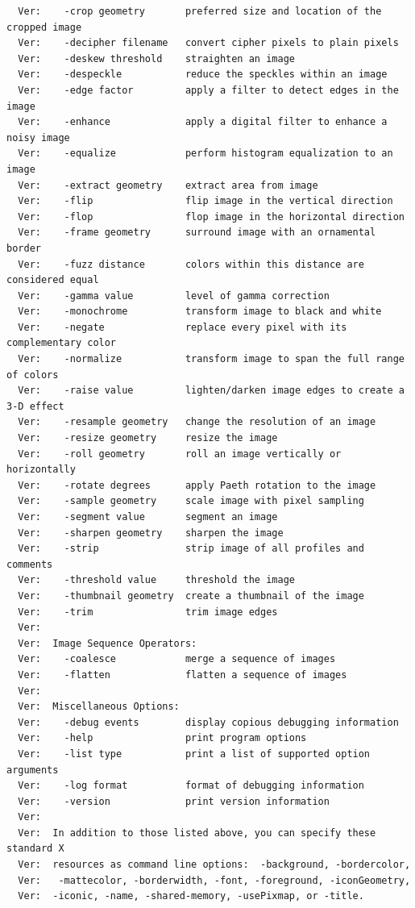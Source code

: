 \documentclass[11pt]{article}
\begin{document}
\begin{verbatim}
  Ver:    -crop geometry       preferred size and location of the cropped image
  Ver:    -decipher filename   convert cipher pixels to plain pixels
  Ver:    -deskew threshold    straighten an image
  Ver:    -despeckle           reduce the speckles within an image
  Ver:    -edge factor         apply a filter to detect edges in the image
  Ver:    -enhance             apply a digital filter to enhance a noisy image
  Ver:    -equalize            perform histogram equalization to an image
  Ver:    -extract geometry    extract area from image
  Ver:    -flip                flip image in the vertical direction
  Ver:    -flop                flop image in the horizontal direction
  Ver:    -frame geometry      surround image with an ornamental border
  Ver:    -fuzz distance       colors within this distance are considered equal
  Ver:    -gamma value         level of gamma correction
  Ver:    -monochrome          transform image to black and white
  Ver:    -negate              replace every pixel with its complementary color
  Ver:    -normalize           transform image to span the full range of colors
  Ver:    -raise value         lighten/darken image edges to create a 3-D effect
  Ver:    -resample geometry   change the resolution of an image
  Ver:    -resize geometry     resize the image
  Ver:    -roll geometry       roll an image vertically or horizontally
  Ver:    -rotate degrees      apply Paeth rotation to the image
  Ver:    -sample geometry     scale image with pixel sampling
  Ver:    -segment value       segment an image
  Ver:    -sharpen geometry    sharpen the image
  Ver:    -strip               strip image of all profiles and comments
  Ver:    -threshold value     threshold the image
  Ver:    -thumbnail geometry  create a thumbnail of the image
  Ver:    -trim                trim image edges
  Ver:  
  Ver:  Image Sequence Operators:
  Ver:    -coalesce            merge a sequence of images
  Ver:    -flatten             flatten a sequence of images
  Ver:  
  Ver:  Miscellaneous Options:
  Ver:    -debug events        display copious debugging information
  Ver:    -help                print program options
  Ver:    -list type           print a list of supported option arguments
  Ver:    -log format          format of debugging information
  Ver:    -version             print version information
  Ver:  
  Ver:  In addition to those listed above, you can specify these standard X
  Ver:  resources as command line options:  -background, -bordercolor,
  Ver:   -mattecolor, -borderwidth, -font, -foreground, -iconGeometry,
  Ver:  -iconic, -name, -shared-memory, -usePixmap, or -title.

\end{verbatim}
\end{document}
